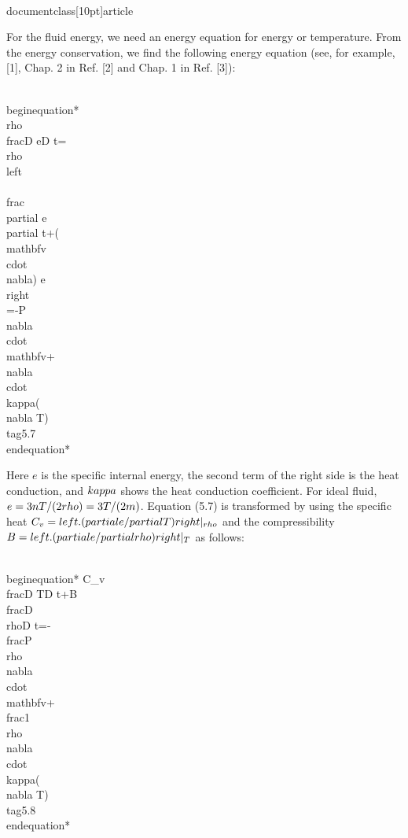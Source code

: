 \\documentclass[10pt]{article}
\begin{document}
For the fluid energy, we need an energy equation for energy or temperature. From the energy conservation, we find the following energy equation (see, for example, [1], Chap. 2 in Ref. [2] and Chap. 1 in Ref. [3]):


\\begin{equation*}
\\rho \\frac{D e}{D t}=\\rho\\left\\{\\frac{\\partial e}{\\partial t}+(\\mathbf{v} \\cdot \\nabla) e\\right\\}=-P \\nabla \\cdot \\mathbf{v}+\\nabla \\cdot \\kappa(\\nabla T) \\tag{5.7}
\\end{equation*}


Here $e$ is the specific internal energy, the second term of the right side is the heat conduction, and $\\kappa$ shows the heat conduction coefficient. For ideal fluid, $e=3 n T /(2 \\rho)=3 T /(2 m)$. Equation (5.7) is transformed by using the specific heat $C_{v}=\\left.(\\partial e / \\partial T)\\right|_{\\rho}$ and the compressibility $B=\\left.(\\partial e / \\partial \\rho)\\right|_{T}$ as follows:


\\begin{equation*}
C_{v} \\frac{D T}{D t}+B \\frac{D \\rho}{D t}=-\\frac{P}{\\rho} \\nabla \\cdot \\mathbf{v}+\\frac{1}{\\rho} \\nabla \\cdot \\kappa(\\nabla T) \\tag{5.8}
\\end{equation*}
\end{document}
